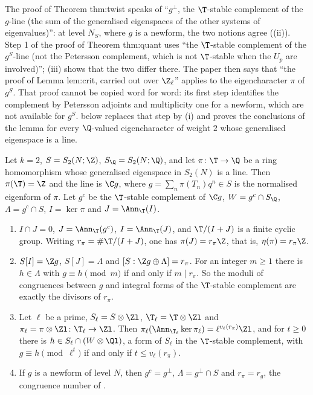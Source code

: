 \begin{paperlink}\label{pl:hecke:complements}
The proof of Theorem thm:twist speaks of ``$g^\perp$, the $\T$-stable complement of the $g$-line (the sum of the generalised eigenspaces of the other systems of eigenvalues)'': at level $N_S$,
where $g$ is a newform, the two notions agree ((ii)). Step 1 of the proof of Theorem thm:quant uses ``the $\T$-stable complement of the $g^S$-line (not the
Petersson complement, which is not $\T$-stable when the $U_p$ are involved)''; (iii) shows that the two differ there. The paper then says that
``the proof of Lemma lem:crit, carried out over $\Z_\ell$'' applies to the eigencharacter $\pi$ of $g^S$. That proof cannot be copied word for word: its first step identifies the
complement by Petersson adjoints and multiplicity one for a newform, which are not available for $g^S$.  below replaces that step by
(i) and proves the conclusions of the lemma for every $\Q$-valued eigencharacter of weight $2$ whose generalised eigenspace is a line.
\end{paperlink}

\begin{proposition}\label{prop:hecke:congruence-module}
Let $k=2$, $S=S_2(N;\Z)$, $S_\Q=S_2(N;\Q)$, and let $\pi\colon\T\to\Q$ be a ring homomorphism whose generalised eigenspace in $S_2(N)$ is a line. Then $\pi(\T)=\Z$ and the line is
$\C g$, where $g=\sum_n\pi(T_n)q^n\in S$ is the normalised eigenform of $\pi$. Let $g^c$ be the $\T$-stable complement of $\C g$, $W=g^c\cap S_\Q$, $\Lambda=g^c\cap S$, $I=\ker\pi$ and $J=\Ann_\T(I)$.
\begin{enumerate}[label=(\roman*)]
\item $I\cap J=0$, $J=\Ann_\T(g^c)$, $I=\Ann_\T(J)$, and $\T/(I+J)$ is a finite cyclic group. Writing $r_\pi=\#\T/(I+J)$, one has $\pi(J)=r_\pi\Z$, that is, $\eta(\pi)=r_\pi\Z$.
\item $S[I]=\Z g$, $S[J]=\Lambda$ and $[S:\Z g\oplus\Lambda]=r_\pi$. For an integer $m\ge1$ there is $h\in\Lambda$ with $g\equiv h\pmod m$ if and only if $m\mid r_\pi$. So the moduli of congruences
between $g$ and integral forms of the $\T$-stable complement are exactly the divisors of $r_\pi$.
\item Let $\ell$ be a prime, $S_\ell=S\otimes\Zl$, $\T_\ell=\T\otimes\Zl$ and $\pi_\ell=\pi\otimes\Zl\colon\T_\ell\to\Zl$. Then $\pi_\ell(\Ann_{\T_\ell}\ker\pi_\ell)=\ell^{v_\ell(r_\pi)}\Zl$, and for $t\ge0$ there is
$h\in S_\ell\cap(W\otimes\Ql)$, a form of $S_\ell$ in the $\T$-stable complement, with $g\equiv h\pmod{\ell^t}$ if and only if $t\le v_\ell(r_\pi)$.
\item If $g$ is a newform of level $N$, then $g^c=g^\perp$, $\Lambda=g^\perp\cap S$ and $r_\pi=r_g$, the congruence number of .
\end{enumerate}
\end{proposition}

